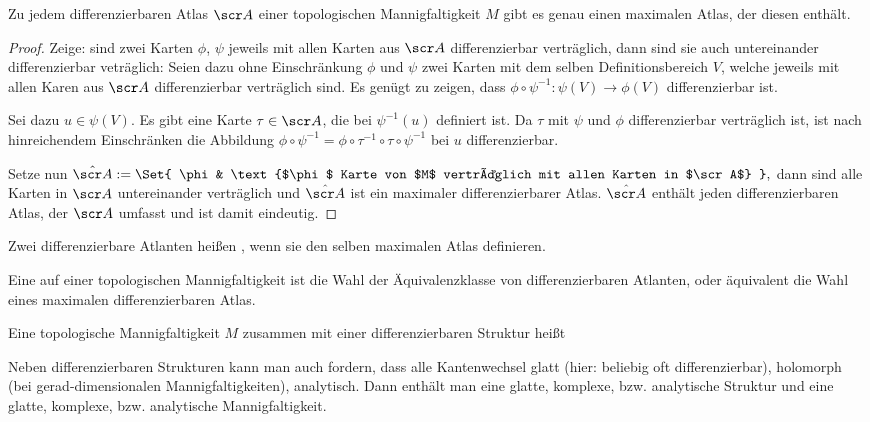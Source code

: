 \begin{st} \label{1.7}
    Zu jedem differenzierbaren Atlas $\scr A$ einer topologischen Mannigfaltigkeit $M$ gibt es genau einen maximalen Atlas, der diesen enthält.
    \begin{proof}
        Zeige: sind zwei Karten $\phi$, $\psi$ jeweils mit allen Karten aus $\scr A$ differenzierbar verträglich, dann sind sie auch untereinander differenzierbar veträglich:
        Seien dazu ohne Einschränkung $\phi$ und $\psi$ zwei Karten mit dem selben Definitionsbereich $V$, welche jeweils mit allen Karen aus $\scr A$ differenzierbar verträglich sind.
        Es genügt zu zeigen, dass
        \begin{math}
            \phi \circ \psi^{-1}: \psi(V) \to \phi(V)
        \end{math}
        differenzierbar ist.

        Sei dazu $u \in \psi(V)$.
        Es gibt eine Karte $\tau \in \scr A$, die bei $\psi^{-1}(u)$ definiert ist.
        Da $\tau$ mit $\psi$ und $\phi$ differenzierbar verträglich ist, ist nach hinreichendem Einschränken die Abbildung
        \begin{math}
            \phi \circ \psi^{-1} = \phi \circ \tau^{-1} \circ \tau \circ \psi^{-1}
        \end{math}
        bei $u$ differenzierbar.

        Setze nun
        \begin{math}
            \hat{\scr A} := \Set{ \phi & \text{$\phi$ Karte von $M$ verträglich mit allen Karten in $\scr A$} },
        \end{math}
        dann sind alle Karten in $\scr A$ untereinander verträglich und $\hat{\scr A}$ ist ein maximaler differenzierbarer Atlas.
        $\hat{\scr A}$ enthält jeden differenzierbaren Atlas, der $\scr A$ umfasst und ist damit eindeutig.
    \end{proof}
\end{st}

\begin{df*}
    Zwei differenzierbare Atlanten heißen , wenn sie den selben maximalen Atlas definieren.
\end{df*}

\begin{df} \label{1.8}
    Eine  auf einer topologischen Mannigfaltigkeit ist die Wahl der Äquivalenzklasse von differenzierbaren Atlanten, oder äquivalent die Wahl eines maximalen differenzierbaren Atlas.

    Eine topologische Mannigfaltigkeit $M$ zusammen mit einer differenzierbaren Struktur heißt 
    \begin{note}
        Neben differenzierbaren Strukturen kann man auch fordern, dass alle Kantenwechsel glatt (hier: beliebig oft differenzierbar), holomorph (bei gerad-dimensionalen Mannigfaltigkeiten), analytisch.
        Dann enthält man eine glatte, komplexe, bzw. analytische Struktur und eine glatte, komplexe, bzw. analytische Mannigfaltigkeit.
    \end{note}
\end{df}


